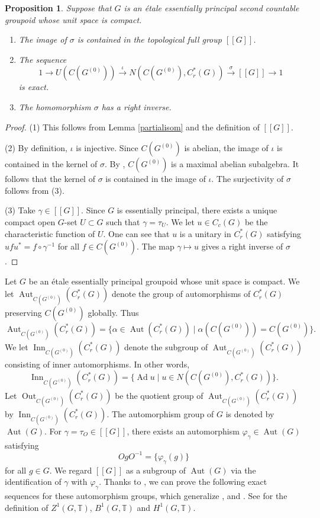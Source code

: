 \documentclass[11pt]{article}
\newtheorem{prop}[thm]{Proposition}
\theoremstyle{definition}
\renewcommand{\phi}{\varphi}
\newcommand{\Aut}{\operatorname{Aut}}
\newcommand{\Inn}{\operatorname{Inn}}
\newcommand{\Out}{\operatorname{Out}}
\newcommand{\Ad}{\operatorname{Ad}}
\newcommand{\T}{\mathbb{T}}
\begin{document}
\begin{prop}\label{exact}
Suppose that $G$ is an \'etale essentially principal second countable groupoid 
whose unit space is compact. 
\begin{enumerate}
\item The image of $\sigma$ is contained 
in the topological full group $[[G]]$. 
\item The sequence 
\[
1\longrightarrow U(C(G^{(0)}))\stackrel{\iota}{\longrightarrow}
N(C(G^{(0)}),C^*_r(G))\stackrel{\sigma}{\longrightarrow}
[[G]]\longrightarrow1
\]
is exact. 
\item The homomorphism $\sigma$ has a right inverse. 
\end{enumerate}
\end{prop}
\begin{proof}
(1) This follows from Lemma \ref{partialisom} and 
the definition of $[[G]]$. 

(2) By definition, $\iota$ is injective. 
Since $C(G^{(0)})$ is abelian, 
the image of $\iota$ is contained in the kernel of $\sigma$. 
By \cite[Proposition II.4.7]{R1}, 
$C(G^{(0)})$ is a maximal abelian subalgebra. 
It follows that the kernel of $\sigma$ is contained in the image of $\iota$. 
The surjectivity of $\sigma$ follows from (3). 

(3) Take $\gamma\in[[G]]$. 
Since $G$ is essentially principal, 
there exists a unique compact open $G$-set $U\subset G$ 
such that $\gamma=\tau_U$. 
We let $u\in C_c(G)$ be the characteristic function of $U$. 
One can see that $u$ is a unitary in $C^*_r(G)$ 
satisfying $ufu^*=f\circ\gamma^{-1}$ for all $f\in C(G^{(0)})$. 
The map $\gamma\mapsto u$ gives a right inverse of $\sigma$. 
\end{proof}

Let $G$ be an \'etale essentially principal groupoid 
whose unit space is compact. 
We let $\Aut_{C(G^{(0)})}(C^*_r(G))$ denote 
the group of automorphisms of $C^*_r(G)$ preserving $C(G^{(0)})$ globally. 
Thus 
\[
\Aut_{C(G^{(0)})}(C^*_r(G))
=\{\alpha\in\Aut(C^*_r(G))\mid\alpha(C(G^{(0)}))=C(G^{(0)})\}. 
\]
We let $\Inn_{C(G^{(0)})}(C^*_r(G))$ denote the subgroup 
of $\Aut_{C(G^{(0)})}(C^*_r(G))$ consisting of inner automorphisms. 
In other words, 
\[\Inn_{C(G^{(0)})}(C^*_r(G))
=\{\Ad u\mid u\in N(C(G^{(0)}),C^*_r(G))\}. 
\]
Let $\Out_{C(G^{(0)})}(C^*_r(G))$ be the quotient group of 
$\Aut_{C(G^{(0)})}(C^*_r(G))$ by $\Inn_{C(G^{(0)})}(C^*_r(G))$. 
The automorphism group of $G$ is denoted by $\Aut(G)$. 
For $\gamma=\tau_O\in[[G]]$, 
there exists an automorphism $\phi_\gamma\in\Aut(G)$ satisfying 
\[
OgO^{-1}=\{\phi_\gamma(g)\}
\]
for all $g\in G$. 
We regard $[[G]]$ as a subgroup of $\Aut(G)$ 
via the identification of $\gamma$ with $\phi_\gamma$. 
Thanks to \cite[Proposition 4.11]{R3}, 
we can prove the following exact sequences for these automorphism groups, 
which generalize \cite[Proposition 2.4]{GPS2}, \cite[Theorem 3]{T2} and 
\cite[Theorem 1.3]{Matsu}. 
See \cite[Definition I.1.12]{R1} for the definition of 
$Z^1(G,\T)$, $B^1(G,\T)$ and $H^1(G,\T)$. 
\end{document}
